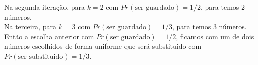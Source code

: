 \documentclass{article}
\begin{document}
Na segunda iteração, para $k=2$ com $Pr(\text{ser guardado}) = 1/2$, para
temos 2 números.\\

Na terceira, para $k=3$ com $Pr(\text{ser guardado}) = 1/3$, para
temos 3 números. Então a escolha anterior com $Pr(\text{ser guardado}) = 1/2$,
ficamos com um de dois números escolhidos de forma uniforme que será substituido
com $Pr(\text{ser substituido}) = 1/3$.
\end{document}
